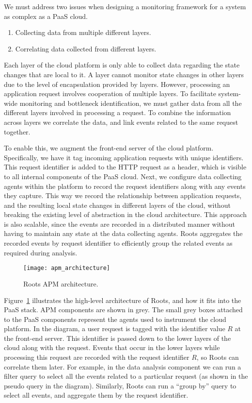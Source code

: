 We must address two issues when designing a monitoring framework for
a system as complex as a PaaS cloud.
\begin{enumerate}
\item Collecting data from multiple different layers.
\item Correlating data collected from different layers.
\end{enumerate}

Each layer of the cloud platform is only able to collect data regarding the
state changes that are local to it. A layer cannot monitor state changes
in other layers due to the level of encapsulation provided by layers. However,
processing an application request involves cooperation of multiple layers. 
To facilitate system-wide monitoring and
bottleneck identification, we must gather data from all the different layers involved
in processing a request. To combine the information across layers
we correlate the data, and link events related to the same request together.

To enable this, we augment the front-end server of the cloud platform. 
Specifically, we have it tag incoming application requests with unique identifiers.
This request identifier is added to the HTTP request as a header, which is visible to all 
internal components of the PaaS cloud. Next, we configure data collecting agents 
within the platform to record the request identifiers along with any events they capture. 
This way we record the relationship between application requests, and the resulting
local state changes in different layers of the cloud, without breaking the existing level
of abstraction in the cloud architecture. This approach is also scalable, since the events are
recorded in a distributed manner without having to maintain any state at the data collecting agents. 
Roots aggregates the recorded events by request 
identifier to efficiently group the related events as required during analysis.

\begin{figure}
\centering
\texttt{[image: apm\_architecture]}
\caption{Roots APM architecture.}
\label{fig:apm_architecture}
\end{figure}

Figure~\ref{fig:apm_architecture} illustrates the high-level architecture of Roots, and how 
it fits into the PaaS stack. APM components are shown in grey. 
The small grey boxes attached to the PaaS components represent the
agents used to instrument the cloud platform. 
In the diagram, a user request is tagged with the identifier value
$R$ at the front-end server. This identifier is passed down to the lower layers of the cloud
along with the request. Events that occur in the lower layers while processing this request
are recorded with the request identifier $R$, so Roots can correlate them later. For example, in the 
data analysis component we can run a filter query to select all the events related to a particular
request (as shown in the pseudo query in the diagram). Similarly, Roots can run a ``group by'' 
query to select all events, and aggregate them by the request identifier.

